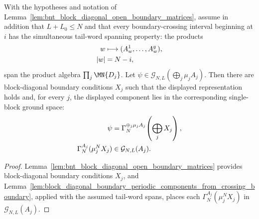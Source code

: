 \begin{lemma}
    \label{thm:block_diagonal_boundary_periodic_components_from_crossing_span}
    \leanok
    With the hypotheses and notation of
    Lemma~\ref{lem:bnt_block_diagonal_open_boundary_matrices}, assume in
    addition that $L+L_0\le N$ and that every boundary-crossing interval
    beginning at $i$ has the simultaneous tail-word spanning property: the
    products
    \begin{align}
        w   & \longmapsto (A^1_w,\ldots,A^g_w),
        \notag                                  \\
        |w| & =N-i,
        \notag
    \end{align}
    span the product algebra $\prod_j\MN{D_j}$. Let
    $\psi\in\mathcal G_{N,L}(\bigoplus_j\mu_jA_j)$. Then there are
    block-diagonal boundary conditions $X_j$ such that the displayed
    representation holds and, for every $j$, the displayed component lies in
    the corresponding single-block ground space:
    \begin{align}
        \psi
         & =
        \Gamma_N^{\oplus_j\mu_jA_j}\!\left(\bigoplus_jX_j\right),
        \notag                       \\
        \Gamma_N^{A_j}(\mu_j^NX_j)
         & \in\mathcal G_{N,L}(A_j).
        \notag
    \end{align}
\end{lemma}

\begin{proof}
    \leanok
    Lemma~\ref{lem:bnt_block_diagonal_open_boundary_matrices} provides
    block-diagonal boundary conditions $X_j$, and
    Lemma~\ref{lem:block_diagonal_boundary_periodic_components_from_crossing_boundary},
    applied with the assumed tail-word spans, places each
    $\Gamma_N^{A_j}(\mu_j^NX_j)$ in $\mathcal G_{N,L}(A_j)$.
\end{proof}

